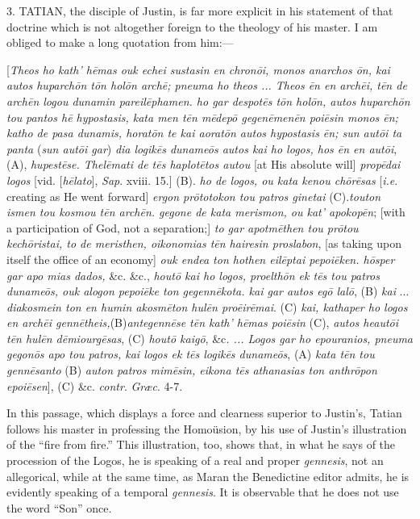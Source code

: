 3. TATIAN, the disciple of Justin, is far
more explicit in his statement of that doctrine which is not
altogether foreign to the theology of his master. I am obliged to make
a long quotation from him:—

[\emph{Theos ho kath' h\={e}mas ouk echei sustasin en chron\={o}i,
monos anarchos \={o}n, kai autos huparch\={o}n t\={o}n hol\={o}n
arch\={e}; pneuma ho theos ... Theos \={e}n en arch\={e}i, t\={e}n
de arch\={e}n logou dunamin pareil\={e}phamen. ho gar despot\={e}s
t\={o}n hol\={o}n, autos huparch\={o}n tou} \emph{pantos
h\={e} hypostasis, kata men t\={e}n m\={e}dep\={o} gegen\={e}men\={e}n
poi\={e}sin monos \={e}n; katho de pasa dunamis, horat\={o}n
te kai aorat\={o}n autos hypostasis \={e}n; sun aut\={o}i ta
panta} (\emph{sun aut\={o}i gar}) \emph{dia logik\={e}s duname\={o}s
autos kai ho logos, hos \={e}n en aut\={o}i}, (A), \emph{hupest\={e}se.
Thel\={e}mati de t\={e}s haplot\={e}tos autou} [at His
absolute will] \emph{prop\={e}dai logos} [vid. [\emph{h\={e}lato}],
\emph{Sap}. xviii. 15.] (B). \emph{ho de logos, ou kata kenou ch\={o}r\={e}sas}
[\emph{i.e}. creating as He went forward] \emph{ergon pr\={o}totokon
tou patros ginetai} (C).\emph{touton ismen tou kosmou t\={e}n arch\={e}n.
gegone de kata merismon, ou kat' apokop\={e}n}; [with a
participation of God, not a separation;] \emph{to gar apotm\={e}then
tou pr\={o}tou kech\={o}ristai, to de meristhen, oikonomias t\={e}n
hairesin proslabon}, [as taking upon itself the office of an
economy] \emph{ouk endea ton hothen eil\={e}ptai pepoi\={e}ken. h\={o}sper
gar apo mias dados,} \&c. \&c., \emph{hout\={o} kai ho logos,
proelth\={o}n ek t\={e}s tou patros duname\={o}s, ouk alogon
pepoi\={e}ke ton gegenn\={e}kota. kai gar autos eg\={o} lal\={o}},
(B) \emph{kai} ... \emph{diakosmein ton en humin akosm\={e}ton hul\={e}n
pro\={e}ir\={e}mai}. (C) \emph{kai, kathaper ho logos en arch\={e}i
genn\={e}theis,}(B)\emph{antegenn\={e}se t\={e}n kath' h\={e}mas
poi\={e}sin} (C), \emph{autos heaut\={o}i t\={e}n hul\={e}n
d\={e}miourg\={e}sas}, (C) \emph{hout\={o} kaig\={o}}, \&c\emph{.
... Logos gar ho epouranios, pneuma gegon\={o}s apo tou patros, kai
logos ek t\={e}s logik\={e}s duname\={o}s}, (A) \emph{kata t\={e}n
tou genn\={e}santo} (B) \emph{auton patros mim\={e}sin, eikona t\={e}s
athanasias ton anthr\={o}pon epoi\={e}sen}], (C) \&c. \emph{contr}.
\emph{Græc}. 4-7.

In this passage, which displays a force and clearness superior to
Justin's, Tatian follows his master in professing the Homoüsion, by
his use of Justin's illustration of the ``fire from fire.''
This illustration, too, shows that, in what he says of the procession
of the Logos, he is speaking of a real and proper \emph{gennesis}, not
an allegorical, while at the same time, as Maran the Benedictine
editor admits, he is evidently speaking of a temporal \emph{gennesis}.
It is observable that he does not use the word ``Son'' once.

